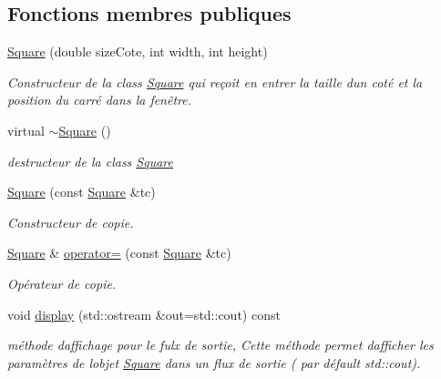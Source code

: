 \subsection*{Fonctions membres publiques}
\begin{DoxyCompactItemize}
\item 
\hyperlink{classgeometric_shape_1_1_square_ac8ab62028f88aa5a1683a287626ab8b3}{Square} (double size\+Cote, int width, int height)
\begin{DoxyCompactList}\small\item\em Constructeur de la class \hyperlink{classgeometric_shape_1_1_square}{Square} qui reçoit en entrer la taille d\textquotesingle{}un coté et la position du carré dans la fenêtre. \end{DoxyCompactList}\item 
\mbox{\label{classgeometric_shape_1_1_square_adc8b2aafbfccdd1f5aa39a2a518bc9d7}} 
virtual \hyperlink{classgeometric_shape_1_1_square_adc8b2aafbfccdd1f5aa39a2a518bc9d7}{$\sim$\+Square} ()
\begin{DoxyCompactList}\small\item\em destructeur de la class \hyperlink{classgeometric_shape_1_1_square}{Square} \end{DoxyCompactList}\item 
\hyperlink{classgeometric_shape_1_1_square_af51ec6057f978c91f935b16839dfebd1}{Square} (const \hyperlink{classgeometric_shape_1_1_square}{Square} \&tc)
\begin{DoxyCompactList}\small\item\em Constructeur de copie. \end{DoxyCompactList}\item 
\hyperlink{classgeometric_shape_1_1_square}{Square} \& \hyperlink{classgeometric_shape_1_1_square_a6d6c18d6f3b6e93db5e9a9def16c701c}{operator=} (const \hyperlink{classgeometric_shape_1_1_square}{Square} \&tc)
\begin{DoxyCompactList}\small\item\em Opérateur de copie. \end{DoxyCompactList}\item 
void \hyperlink{classgeometric_shape_1_1_square_a945551a983f2476d6e39c572f7f66ec9}{display} (std\+::ostream \&out=std\+::cout) const
\begin{DoxyCompactList}\small\item\em méthode d\textquotesingle{}affichage pour le fulx de sortie, Cette méthode permet d\textquotesingle{}afficher les paramètres de l\textquotesingle{}objet \hyperlink{classgeometric_shape_1_1_square}{Square} dans un flux de sortie ( par défault std\+::cout). \end{DoxyCompactList}\end{DoxyCompactItemize}

